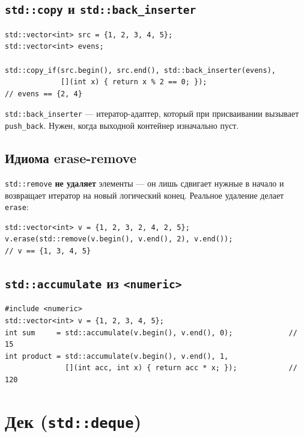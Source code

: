 \documentclass[a4paper,12pt]{article}
\begin{document}
\subsection{\texttt{std::copy} и \texttt{std::back\_inserter}}

\begin{lstlisting}
std::vector<int> src = {1, 2, 3, 4, 5};
std::vector<int> evens;

std::copy_if(src.begin(), src.end(), std::back_inserter(evens),
             [](int x) { return x % 2 == 0; });
// evens == {2, 4}
\end{lstlisting}

\texttt{std::back\_inserter} --- итератор-адаптер, который при присваивании
вызывает \texttt{push\_back}. Нужен, когда выходной контейнер изначально пуст.

\subsection{Идиома erase-remove}

\texttt{std::remove} \textbf{не удаляет} элементы --- он лишь сдвигает
нужные в начало и возвращает итератор на новый логический конец.
Реальное удаление делает \texttt{erase}:

\begin{lstlisting}
std::vector<int> v = {1, 2, 3, 2, 4, 2, 5};
v.erase(std::remove(v.begin(), v.end(), 2), v.end());
// v == {1, 3, 4, 5}
\end{lstlisting}

\subsection{\texttt{std::accumulate} из \texttt{<numeric>}}

\begin{lstlisting}
#include <numeric>
std::vector<int> v = {1, 2, 3, 4, 5};
int sum     = std::accumulate(v.begin(), v.end(), 0);             // 15
int product = std::accumulate(v.begin(), v.end(), 1,
              [](int acc, int x) { return acc * x; });            // 120
\end{lstlisting}

\newpage
\section{Дек (\texttt{std::deque})}
\end{document}
